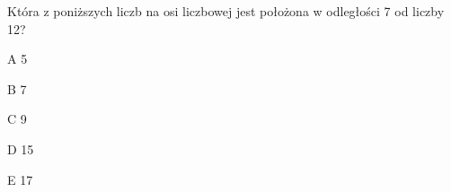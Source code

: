 \begin{tresc}
Która z poniższych liczb na osi liczbowej jest położona w odległości 7 od liczby 12?
\end{tresc}
\begin{wariant}{A} 5 \end{wariant}
\begin{wariant}{B} 7 \end{wariant}
\begin{wariant}{C} 9 \end{wariant}
\begin{wariant}{D} 15 \end{wariant}
\begin{wariant}{E} 17 \end{wariant}
